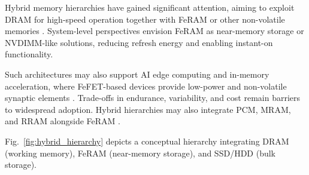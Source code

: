 Hybrid memory hierarchies have gained significant attention, aiming to exploit DRAM for high-speed operation together with FeRAM or other non-volatile memories \cite{samsung2021,itrs2022}. System-level perspectives envision FeRAM as near-memory storage or NVDIMM-like solutions, reducing refresh energy and enabling instant-on functionality. 

Such architectures may also support AI edge computing and in-memory acceleration, where FeFET-based devices provide low-power and non-volatile synaptic elements \cite{schaller2021}. Trade-offs in endurance, variability, and cost remain barriers to widespread adoption. Hybrid hierarchies may also integrate PCM, MRAM, and RRAM alongside FeRAM \cite{itrs2022}. 

Fig.~\ref{fig:hybrid_hierarchy} depicts a conceptual hierarchy integrating DRAM (working memory), FeRAM (near-memory storage), and SSD/HDD (bulk storage).
